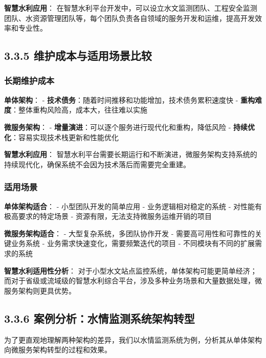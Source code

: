 \textbf{智慧水利应用}：
在智慧水利平台开发中，可以设立水文监测团队、工程安全监测团队、水资源管理团队等，每个团队负责各自领域的服务开发和运维，提高开发效率和专业性。

\subsection{3.3.5
维护成本与适用场景比较}\label{ux7ef4ux62a4ux6210ux672cux4e0eux9002ux7528ux573aux666fux6bd4ux8f83}

\subsubsection{长期维护成本}\label{ux957fux671fux7ef4ux62a4ux6210ux672c}

\textbf{单体架构}： -
\textbf{技术债务}：随着时间推移和功能增加，技术债务累积速度快 -
\textbf{重构难度}：整体重构风险高，成本大，往往难以实施

\textbf{微服务架构}： -
\textbf{增量演进}：可以逐个服务进行现代化和重构，降低风险 -
\textbf{持续优化}：容易实现技术栈更新和性能优化

\textbf{智慧水利应用}：
智慧水利平台需要长期运行和不断演进，微服务架构支持系统的持续现代化，确保系统不会因为技术落后而需要完全重建。

\subsubsection{适用场景}\label{ux9002ux7528ux573aux666f}

\textbf{单体架构适合}： - 小型团队开发的简单应用 -
业务逻辑相对稳定的系统 - 对性能有极高要求的特定场景 -
资源有限，无法支持微服务运维开销的项目

\textbf{微服务架构适合}： - 大型复杂系统，多团队协作开发 -
需要高可用性和可靠性的关键业务系统 -
业务需求快速变化，需要频繁迭代的项目 - 不同模块有不同的扩展需求的系统

\textbf{智慧水利适用性分析}：
对于小型水文站点监控系统，单体架构可能更简单经济；而对于省级或流域级的智慧水利综合平台，涉及多种业务场景和大量数据处理，微服务架构则更具优势。

\subsection{3.3.6
案例分析：水情监测系统架构转型}\label{ux6848ux4f8bux5206ux6790ux6c34ux60c5ux76d1ux6d4bux7cfbux7edfux67b6ux6784ux8f6cux578b}

为了更直观地理解两种架构的差异，我们以水情监测系统为例，分析其从单体架构向微服务架构转型的过程和效果。

